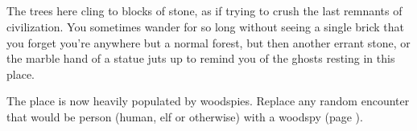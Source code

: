 \begin{multicols}{2}

\humansoldier

\subsection{}\label{lostcity}\setcounter{list}{0}

\begin{boxtext}

The trees here cling to blocks of stone, as if trying to crush the last remnants of civilization.  You sometimes wander for so long without seeing a single brick that you forget you're anywhere but a normal forest, but then another errant stone, or the marble hand of a statue juts up to remind you of the ghosts resting in this place.

\end{boxtext}

The place is now heavily populated by woodspies.  Replace any random encounter that would be person (human, elf or otherwise) with a woodspy (page \pageref{woodspy}).

\end{multicols}

\label{lost_city_map}

